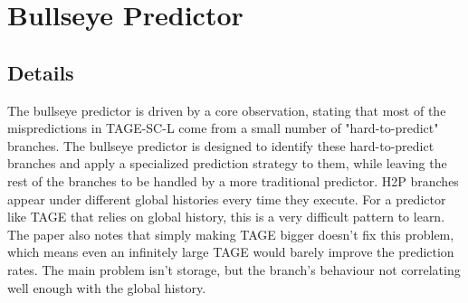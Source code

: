 \documentclass[11pt,a4paper]{article}
\begin{document}
\section{Bullseye Predictor}
\subsection{Details}
The bullseye predictor is driven by a core observation, stating that most of the mispredictions in TAGE-SC-L come from a small number of "hard-to-predict" branches. The bullseye predictor is designed to identify these hard-to-predict branches
and apply a specialized prediction strategy to them, while leaving the rest of the branches to be handled by a more traditional predictor.
H2P branches appear under different global histories every time they execute. For a predictor like TAGE that relies on global history, this is a very difficult pattern to learn.
The paper also notes that simply making TAGE bigger doesn't fix this problem, which means even an infinitely large TAGE would barely improve the prediction rates. The main problem isn't storage, but the branch's behaviour not correlating well enough with
the global history. 
\end{document}
